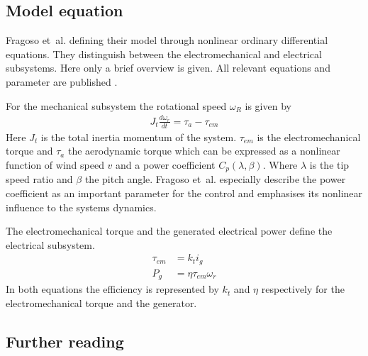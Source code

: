 \subsection{Model equation} \label{sec:intro:model_eq}

Fragoso et~al. defining their model through nonlinear ordinary differential equations. They distinguish between the electromechanical and electrical subsystems. Here only a brief overview is given. All relevant equations and parameter are published \cite{Fragoso_et_al_2017}.

For the mechanical subsystem the rotational speed $\omega_R$ is given by
\begin{align}
    J_t \frac{d\omega_r}{dt} = \tau_a - \tau_{em}
\end{align}
Here $J_t$ is the total inertia momentum of the system.
$\tau_{em}$ is the electromechanical torque and $ \tau_a$ the aerodynamic torque which can be expressed as a nonlinear function of wind speed $v$ and a power coefficient $C_p(\lambda ,\beta)$.
Where $\lambda$ is the tip speed ratio and $\beta$ the pitch angle.
Fragoso et~al. especially describe the power coefficient as an important parameter for the control and emphasises its nonlinear influence to the systems dynamics.


The electromechanical torque and the generated electrical power define the electrical subsystem.
\begin{align}
    \tau_{em} &= k_t i_g \label{eq:intro:tau_em}\\
    P_g &= \eta \tau_{em} \omega_r \label{eq:intro:P_g}
\end{align}
In both equations the efficiency is represented by $k_t$ and $\eta$ respectively for the electromechanical torque and the generator.


\subsection{Further reading}

